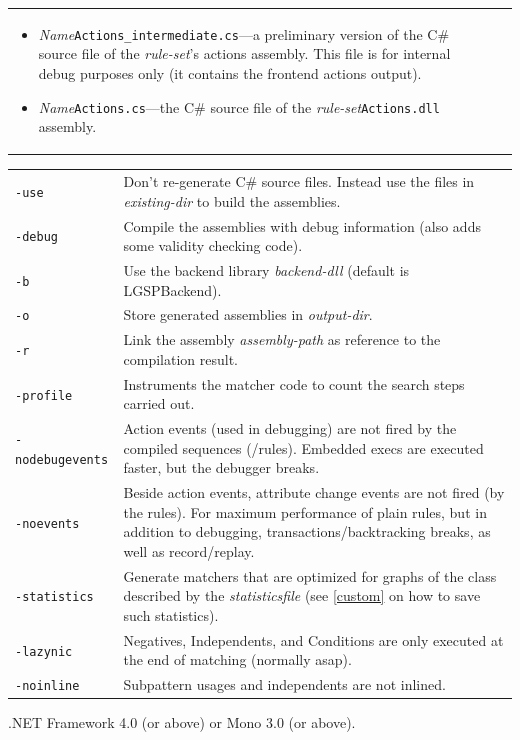 \begin{description}
\begin{tabularx}{\linewidth}{lX}
\begin{itemize}
  \item \emph{Name}\texttt{Actions\_intermediate.cs}---a preliminary version of the C\# source file of the \emph{rule-set}'s actions assembly.
	This file is for internal debug purposes only (it contains the frontend actions output).
  \item \emph{Name}\texttt{Actions.cs}---the C\# source file of the \emph{rule-set}\texttt{Actions.dll} assembly.
\end{itemize}\\
\end{tabularx}
\begin{tabularx}{\linewidth}{lX}
      \texttt{-use} & Don't re-generate C\# source files. Instead use the files in \emph{existing-dir} to build the assemblies.\\
      \texttt{-debug} & Compile the assemblies with debug information (also adds some validity checking code).\\
      \texttt{-b} & Use the backend library \emph{backend-dll} (default is LGSPBackend).\\
      \texttt{-o} & Store generated assemblies in \emph{output-dir}.\\
      \texttt{-r} & Link the assembly \emph{assembly-path} as reference to the compilation result.\\
      \texttt{-profile} & Instruments the matcher code to count the search steps carried out.\\
      \texttt{-nodebugevents} & Action events (used in debugging) are not fired by the compiled sequences (/rules). Embedded execs are executed faster, but the debugger breaks.\\
      \texttt{-noevents} & Beside action events, attribute change events are not fired (by the rules). For maximum performance of plain rules, but in addition to debugging, transactions/backtracking breaks, as well as record/replay.\\
      \texttt{-statistics} & Generate matchers that are optimized for graphs of the class described by the \emph{statisticsfile} (see \ref{custom} on how to save such statistics).\\
      \texttt{-lazynic} & Negatives, Independents, and Conditions are only executed at the end of matching (normally asap).\\
      \texttt{-noinline} & Subpattern usages and independents are not inlined.\\
    \end{tabularx}
  \item[Requires] .NET Framework 4.0 (or above) or Mono 3.0 (or above).
\end{description}

